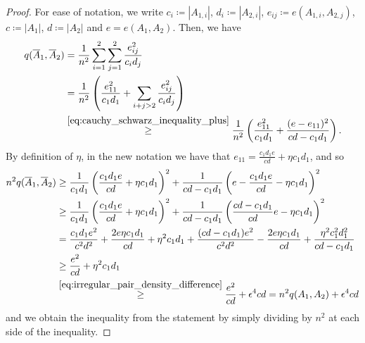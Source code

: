 \begin{lemma}
\begin{proof}
                For ease of notation, we write $c_i \coloneqq |A_{1,i}|$, $d_i \coloneqq |A_{2,i}|$,
                $e_{ij} \coloneqq e(A_{1,i},A_{2,j})$, $c \coloneqq |A_1|$, $d \coloneqq |A_2|$ and $e = e(A_1, A_2)$.
                Then, we have
                \begin{align*}
                    q(\overline{A}_1, \overline{A}_2)
                        & = \frac{1}{n^2} \sum_{i=1}^2 \sum_{j=1}^2 \frac{e_{ij}^2}{c_i d_j} \\
                        & = \frac{1}{n^2} \left( 
                            \frac{e_{11}^2}{c_1 d_1} + \sum_{i + j > 2} \frac{e_{ij}^2}{c_i d_j} \right) \\
                        & \stackrel{\eqref{eq:cauchy_schwarz_inequality_plus}}{\geq}
                            \frac{1}{n^2} \left( 
                                \frac{e_{11}^2}{c_1 d_1} + \frac{(e - e_{11})^2}{cd - c_1 d_1} \right).
                \end{align*}
                By definition of $\eta$, in the new notation we have that $e_{11} = \frac{c_1 d_1 e}{cd} + \eta c_1 d_1$,
                and so
                \begin{align*}
                    n^2 q(\overline{A}_1, \overline{A}_2)
                        & \geq \frac{1}{c_1 d_1} \left( \frac{c_1 d_1 e}{cd} + \eta c_1 d_1 \right)^2
                            + \frac{1}{cd - c_1 d_1} \left( e - \frac{c_1 d_1 e}{cd} - \eta c_1 d_1 \right)^2 \\
                        & \geq \frac{1}{c_1 d_1} \left( \frac{c_1 d_1 e}{cd} + \eta c_1 d_1 \right)^2
                            + \frac{1}{cd - c_1 d_1} \left( \frac{cd - c_1 d_1}{cd} e - \eta c_1 d_1 \right)^2 \\
                        & = \frac{c_1 d_1 e^2}{c^2 d^2} + \frac{2 e \eta c_1 d_1}{cd}
                            + \eta^2 c_1 d_1
                            + \frac{(cd - c_1 d_1) e^2}{c^2 d^2}
                            - \frac{2 e \eta c_1 d_1}{cd}
                            + \frac{\eta^2 c_1^2 d_1^2}{cd - c_1 d_1} \\
                        & \geq \frac{e^2}{cd} + \eta^2 c_1 d_1 \\
                        & \stackrel{\eqref{eq:irregular_pair_density_difference}}{\geq}
                            \frac{e^2}{cd} + \epsilon^4 c d = n^2 q(A_1, A_2) + \epsilon^4 c d
                \end{align*}
                and we obtain the inequality from the statement by simply dividing by $n^2$ at each side of the inequality.
            \end{proof}
        \end{lemma}

